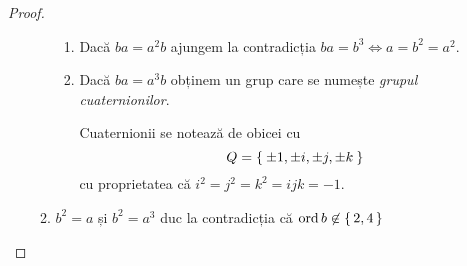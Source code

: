 \begin{proof}
\begin{enumerate}
\begin{enumerate}
\begin{enumerate}
            \item Dacă \(ba = a^2 b\) ajungem la contradicția \(ba = b^3 \iff a = b^2 = a^2\).
            
            \item Dacă \(ba = a^3 b\) obținem un grup care se numește \emph{grupul cuaternionilor}.
            
            Cuaternionii se notează de obicei cu
            \[
                Q = \Set{ \pm 1, \pm i, \pm j, \pm k }
            \]
            cu proprietatea că \(i^2 = j^2 = k^2 = ijk = -1\).
        \end{enumerate}
        
        \item \(b^2 = a\) și \(b^2 = a^3\) duc la contradicția că \(\operatorname{ord} b \not\in \set{2, 4}\)
    \end{enumerate}
\end{enumerate}
\end{proof}
